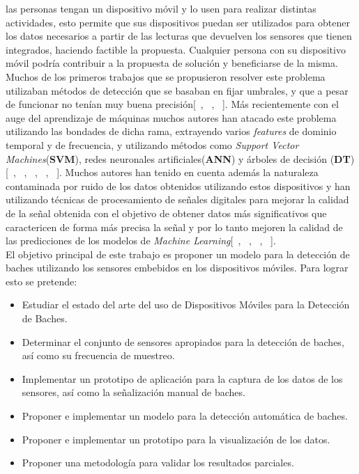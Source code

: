 las personas tengan un dispositivo móvil y lo usen para realizar distintas actividades, esto permite que sus dispositivos puedan ser utilizados
para obtener los datos necesarios a partir de las lecturas que devuelven los sensores que tienen integrados, haciendo factible la propuesta. 
Cualquier persona con su dispositivo m\'{o}vil podría contribuir a la propuesta de solución y beneficiarse de la misma.\\
\indent Muchos de los primeros trabajos que se propusieron resolver este problema utilizaban métodos de detección que se basaban en fijar
umbrales, y que a pesar de funcionar no tenían muy buena precisión[~\parencite{eriksson2008pothole}, ~\parencite{mohan2008nericell},
~\parencite{mednis2011real}]. Más recientemente con el auge del aprendizaje de máquinas muchos autores han atacado este problema 
utilizando las bondades de dicha rama, extrayendo varios \emph{features} de dominio temporal y de frecuencia, y utilizando métodos
como \emph{Support Vector Machines}(\textbf{SVM}), redes neuronales artificiales(\textbf{ANN}) y árboles de decisión (\textbf{DT})
[~\parencite{el2018towards}, ~\parencite{seraj2015roads}, ~\parencite{gonzalez2017learning}, ~\parencite{zheng2020fused},
~\parencite{perttunen2011distributed}]. Muchos autores han tenido en cuenta además la naturaleza contaminada por ruido de los datos
obtenidos utilizando estos dispositivos y han utilizando técnicas de procesamiento de señales digitales para mejorar la calidad de
la señal obtenida con el objetivo de obtener datos más significativos que caractericen de forma más precisa la señal y por lo tanto mejoren la
calidad de las predicciones de los modelos de \emph{Machine Learning}[~\parencite{el2018towards}, ~\parencite{zheng2020fused},
~\parencite{perttunen2011distributed}, ~\parencite{gonzalez2017learning}].\\
\indent El objetivo principal de este trabajo es proponer un modelo para la detección de baches utilizando los sensores embebidos en los
dispositivos móviles. Para lograr esto se pretende:

\begin{itemize}
	\item Estudiar el estado del arte del uso de Dispositivos Móviles para la Detección de Baches.
	\item Determinar el conjunto de sensores apropiados para la detección de baches, así como su frecuencia de muestreo.
	\item Implementar un prototipo de aplicación para la captura de los datos de los sensores, así como la señalización
		manual de baches.
	\item Proponer e implementar un modelo para la detección automática de baches.
	\item Proponer e implementar un prototipo para la visualización de los datos.
	\item Proponer una metodología para validar los resultados parciales.
\end{itemize}
